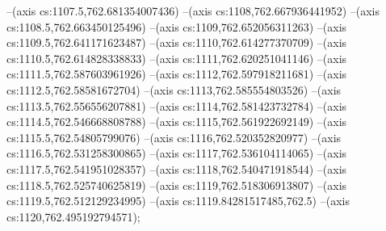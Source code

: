 --(axis cs:1107.5,762.681354007436)
--(axis cs:1108,762.667936441952)
--(axis cs:1108.5,762.663450125496)
--(axis cs:1109,762.652056311263)
--(axis cs:1109.5,762.641171623487)
--(axis cs:1110,762.614277370709)
--(axis cs:1110.5,762.614828338833)
--(axis cs:1111,762.620251041146)
--(axis cs:1111.5,762.587603961926)
--(axis cs:1112,762.597918211681)
--(axis cs:1112.5,762.58581672704)
--(axis cs:1113,762.585554803526)
--(axis cs:1113.5,762.556556207881)
--(axis cs:1114,762.581423732784)
--(axis cs:1114.5,762.546668808788)
--(axis cs:1115,762.561922692149)
--(axis cs:1115.5,762.54805799076)
--(axis cs:1116,762.520352820977)
--(axis cs:1116.5,762.531258300865)
--(axis cs:1117,762.536104114065)
--(axis cs:1117.5,762.541951028357)
--(axis cs:1118,762.540471918544)
--(axis cs:1118.5,762.525740625819)
--(axis cs:1119,762.518306913807)
--(axis cs:1119.5,762.512129234995)
--(axis cs:1119.84281517485,762.5)
--(axis cs:1120,762.495192794571);

